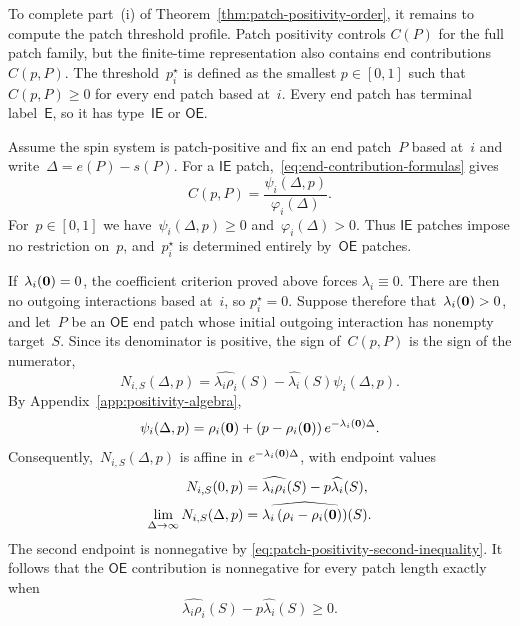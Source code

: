 To complete part~\textup{(i)} of Theorem~\ref{thm:patch-positivity-order}, it
remains to compute the patch threshold profile. Patch positivity controls
$C(P)$ for the full patch family, but the finite-time representation also
contains end contributions~$C(p,P)$. The threshold~$p_i^\star$ is defined as the smallest
$p\in[0,1]$ such that~$C(p,P)\geq0$ for every end patch based at~$i$. Every end
patch has terminal label~$\mathsf E$, so it has type~$\mathsf{IE}$ or
$\mathsf{OE}$.

Assume the spin system is patch-positive and fix an end patch~$P$ based at~$i$ and write~$\Delta=e(P)-s(P)$. For a
$\mathsf{IE}$ patch,~\eqref{eq:end-contribution-formulas} gives
\begin{equation*}
C(p,P)=\frac{\psi_i(\Delta,p)}{\varphi_i(\Delta)}.
\end{equation*}
For~$p\in[0,1]$ we have~$\psi_i(\Delta,p)\geq0$ and~$\varphi_i(\Delta)>0$. Thus
$\mathsf{IE}$ patches impose no restriction on~$p$, and~$p_i^\star$ is
determined entirely by~$\mathsf{OE}$ patches.

If~$\lambda_i(\mathbf{0})=0$, the coefficient criterion proved above forces
$\lambda_i\equiv0$. There are then no outgoing interactions based at~$i$, so
$p_i^\star=0$. Suppose therefore that~$\lambda_i(\mathbf{0})>0$, and let~$P$ be an
$\mathsf{OE}$ end patch whose initial outgoing interaction has nonempty
target~$S$. Since its denominator is positive, the sign of~$C(p,P)$ is the sign
of the numerator,
\begin{equation*}
N_{i,S}(\Delta,p)
=
\widehat{\lambda_i\rho_i}(S)
-
\widehat{\lambda_i}(S)\psi_i(\Delta,p).
\end{equation*}
By Appendix~\ref{app:positivity-algebra},
\begin{equation*}
\psi_i(\Delta,p)
=
\rho_i(\mathbf{0})
+
\left(p-\rho_i(\mathbf{0})\right)e^{-\lambda_i(\mathbf{0})\Delta}.
\end{equation*}
Consequently,~$N_{i,S}(\Delta,p)$ is affine in
$e^{-\lambda_i(\mathbf{0})\Delta}$, with endpoint values
\begin{align*}
N_{i,S}(0,p)
&=
\widehat{\lambda_i\rho_i}(S)
-p\widehat{\lambda_i}(S),
\\
\lim_{\Delta\to\infty}N_{i,S}(\Delta,p)
&=
\widehat{\lambda_i\left(\rho_i-\rho_i(\mathbf{0})\right)}(S).
\end{align*}
The second endpoint is nonnegative by
\eqref{eq:patch-positivity-second-inequality}. It follows that the
$\mathsf{OE}$ contribution is nonnegative for every patch length exactly when
\begin{equation*}
\widehat{\lambda_i\rho_i}(S)
-p\widehat{\lambda_i}(S)
\geq0.
\end{equation*}

